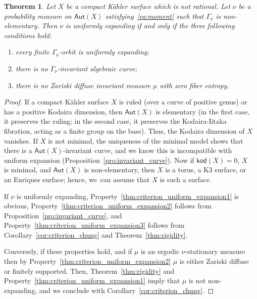 \documentclass[JEP,XML,SOM,Unicode,published]{cedram}
\newcommand\Aut{\mathsf{Aut}}
\theoremstyle{plain}
\newtheorem{thm}{Theorem}[section]
\theoremstyle{definition}
\begin{document}
\begin{thm}\label{thm:criterion_uniform_expansion}
Let $X$ be a compact Kähler surface which is not rational. Let $\nu$ be a probability measure on
$\Aut(X)$ satisfying~\eqref{eq:moment} such that $\Gamma_\nu$ is non-elementary.
Then $\nu$ is uniformly expanding if and only if the three following conditions
hold:
\begin{enumerate}
\item\label{thm:criterion_uniform_expansion1} every finite $\Gamma_\nu$-orbit is uniformly expanding;
\item\label{thm:criterion_uniform_expansion2} there is no $\Gamma_\nu$-invariant algebraic curve;
\item\label{thm:criterion_uniform_expansion3} there is no Zariski diffuse invariant measure $\mu$ with zero fiber entropy.
\end{enumerate}
\end{thm}

\begin{proof} If a compact Kähler surface $X$ is ruled (over a curve of positive genus) or has a positive Kodaira dimension, then $\Aut(X)$ is elementary (in the first case, it preserves the ruling; in the second case, it preserves the Kodaira-Iitaka fibration, acting as a finite group on the base). Thus, the Kodaira dimension of $X$ vanishes. If $X$ is not minimal, the uniqueness of the minimal model shows that there is a $\Aut(X)$-invariant curve, and we know this is incompatible with uniform expansion (Proposition~\ref{pro:invariant_curve}). Now if ${\mathsf{kod}}(X)=0$, $X$ is minimal, and $\Aut(X)$ is non-elementary, then $X$ is a torus, a K3 surface, or an Enriques surface; hence, we~can assume that $X$ is such a surface.

If $\nu$ is uniformly expanding, Property~\eqref{thm:criterion_uniform_expansion1} is obvious, Property~\eqref{thm:criterion_uniform_expansion2} follows from Proposition~\ref{pro:invariant_curve}, and
Property~\eqref{thm:criterion_uniform_expansion3} follows from Corollary~\ref{cor:criterion_chung} and Theorem~\ref{thm:rigidity}.

Conversely, if these properties hold, and if $\mu$ is an ergodic $\nu$-stationary measure then by Property~\eqref{thm:criterion_uniform_expansion2}
$\mu$ is either Zariski diffuse or finitely supported. Then, Theorem~\ref{thm:rigidity} and Property~\eqref{thm:criterion_uniform_expansion1} imply that $\mu$ is not non-expanding, and we conclude with Corollary~\ref{cor:criterion_chung}.
\end{proof}
\end{document}

